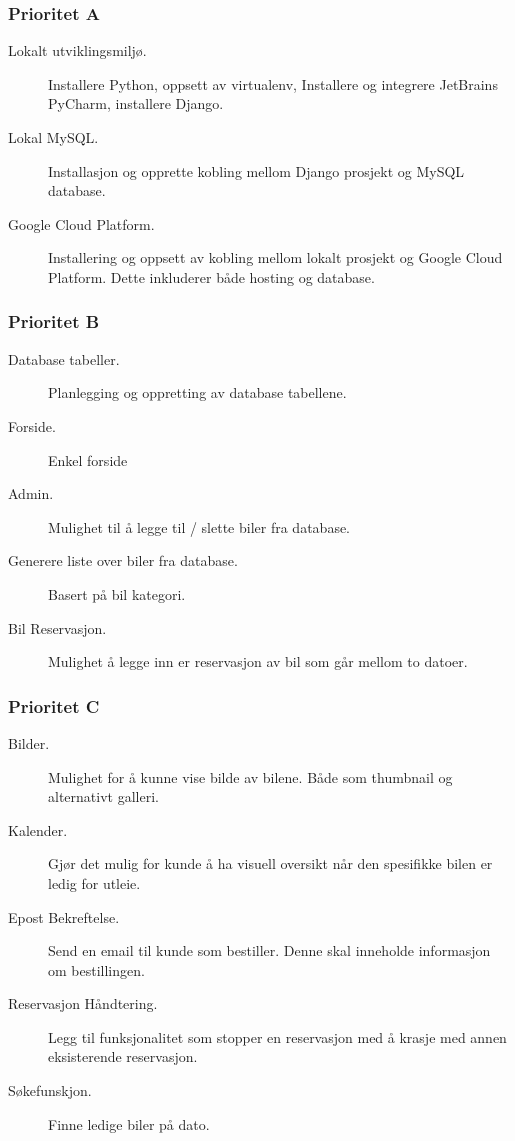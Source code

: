 \subsubsection*{Prioritet A}
\begin{description}
\item [Lokalt utviklingsmiljø.] Installere Python, oppsett av virtualenv, Installere og integrere JetBrains PyCharm, installere Django.
\item [Lokal MySQL.]Installasjon og opprette kobling mellom Django prosjekt og MySQL database. 
\item [Google Cloud Platform.]Installering og oppsett av kobling mellom lokalt prosjekt og Google Cloud Platform. Dette inkluderer både hosting og database.
\end{description}
\subsubsection*{Prioritet B}
\begin{description}
\item [Database tabeller.] Planlegging og oppretting av database tabellene.
\item [Forside.] Enkel forside 
\item [Admin.]Mulighet til å legge til / slette biler fra database.
\item[Generere liste over biler fra database.] Basert på bil kategori.
\item[Bil Reservasjon.] Mulighet å legge inn er reservasjon av bil som går mellom to datoer.
\end{description}

\subsubsection*{Prioritet C}
\begin{description}
\item [Bilder.] Mulighet for å kunne vise bilde av bilene. Både som thumbnail og alternativt galleri.
\item [Kalender.] Gjør det mulig for kunde å ha visuell oversikt når den spesifikke bilen er ledig for utleie. 
\item [Epost Bekreftelse.]Send en email til kunde som bestiller. Denne skal inneholde informasjon om bestillingen.
\item[Reservasjon Håndtering.] Legg til funksjonalitet som stopper en reservasjon med å krasje med annen eksisterende reservasjon.
\item[Søkefunskjon.] Finne ledige biler på dato.
\end{description}


